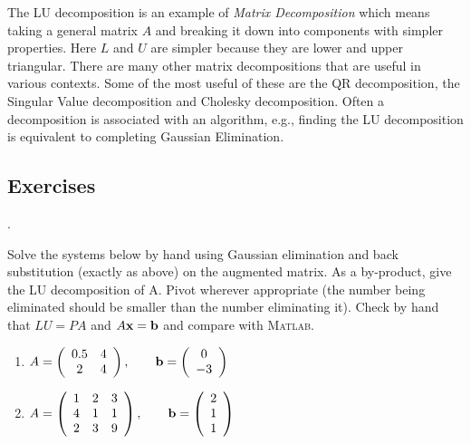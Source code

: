 The LU decomposition is an example of {\em Matrix Decomposition} which
means taking a general matrix $A$ and breaking it down into components
with simpler properties.  Here $L$ and $U$ are simpler because they
are lower and upper triangular. There are many other matrix
decompositions that are useful in various contexts. Some of the most
useful of these are the QR decomposition, the Singular Value
decomposition and Cholesky decomposition. Often a decomposition
is associated with an algorithm, e.g., finding the LU decomposition is equivalent
to completing Gaussian Elimination.



\subsection*{Exercises}
\begin{list}
{.}{}

\item Solve the systems below by hand using Gaussian elimination  and
back substitution (exactly as above) on the augmented matrix. 
As a by-product, give the LU decomposition
of A. Pivot wherever appropriate (the number being eliminated should be smaller than the 
number eliminating it). Check by hand that
$LU=PA$ and $A\mathbf{x} = \mathbf{b}$ and compare with \textsc{Matlab}.
\begin{enumerate}
\item[(a)] $\displaystyle{ A =
      \left(\begin{array}{cc} 0.5 & 4 \\
                               2 & 4
           \end{array} \right), \qquad \mathbf{b}= \left(\begin{array}{c} 0 \\
                                                                -3 \end{array} \right)}
$
\item[(b)] $\displaystyle{ A =
      \left(\begin{array}{ccc} 1 & 2 & 3 \\
                             4 & 1 & 1 \\
                             2 & 3 & 9
           \end{array} \right), \qquad \mathbf{b}= \left(\begin{array}{c} 2 \\
                                                                                                1 \\
                                                                                                1  \end{array} \right)}
$
\end{enumerate}



\end{list}
